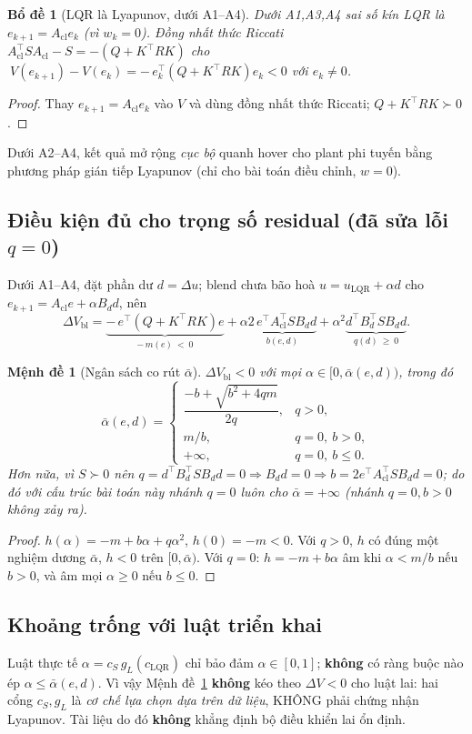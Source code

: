 \documentclass[11pt]{article}
\newtheorem{lemma}{Bổ đề}
\newtheorem{proposition}{Mệnh đề}
\newcommand{\T}{^{\!\top}}
\newcommand{\cS}{c_{S}}
\newcommand{\cL}{c_{\mathrm{LQR}}}
\newcommand{\uL}{u_{\mathrm{LQR}}}
\newcommand{\Acl}{A_{\mathrm{cl}}}
\begin{document}
\begin{lemma}[LQR là Lyapunov, dưới A1--A4]\label{lem1}
Dưới A1,A3,A4 sai số kín LQR là $e_{k+1}=\Acl e_k$ (vì $w_k=0$). Đồng nhất thức Riccati
$\Acl\T S\Acl-S=-(Q+K\T RK)$ cho $\ V(e_{k+1})-V(e_k)=-\,e_k\T(Q+K\T RK)e_k<0$ với $e_k\ne0$.
\end{lemma}
\begin{proof}
Thay $e_{k+1}=\Acl e_k$ vào $V$ và dùng đồng nhất thức Riccati; $Q+K\T RK\succ0$.
\end{proof}
\noindent Dưới A2--A4, kết quả mở rộng \emph{cục bộ} quanh hover cho plant phi tuyến bằng phương pháp gián
tiếp Lyapunov (chỉ cho bài toán điều chỉnh, $w=0$).

\subsection{Điều kiện đủ cho trọng số residual (đã sửa lỗi $q=0$)}
Dưới A1--A4, đặt phần dư $d=\Delta u$; blend chưa bão hoà $u=\uL+\alpha d$ cho $e_{k+1}=\Acl e+\alpha B_d d$,
nên
\begin{equation}
\Delta V_{\mathrm{bl}}
= \underbrace{-\,e\T(Q+K\T RK)e}_{-\,m(e)\ <\ 0}
+\alpha\underbrace{2\,e\T\Acl\T S B_d d}_{b(e,d)}
+\alpha^2\underbrace{d\T B_d\T S B_d d}_{q(d)\ \ge\ 0}. \label{eq:dv}
\end{equation}

\begin{proposition}[Ngân sách co rút $\bar\alpha$]\label{prop}
$\Delta V_{\mathrm{bl}}<0$ với mọi $\alpha\in[0,\bar\alpha(e,d))$, trong đó
\[
\bar\alpha(e,d)=
\begin{cases}
\dfrac{-b+\sqrt{b^2+4qm}}{2q}, & q>0,\\[2mm]
m/b, & q=0,\ b>0,\\[1mm]
+\infty, & q=0,\ b\le0.
\end{cases}
\]
Hơn nữa, vì $S\succ0$ nên $q=d\T B_d\T S B_d d=0\Rightarrow B_d d=0\Rightarrow b=2e\T\Acl\T S B_d d=0$; do
đó với cấu trúc bài toán này nhánh $q=0$ luôn cho $\bar\alpha=+\infty$ (nhánh $q=0,b>0$ không xảy ra).
\end{proposition}
\begin{proof}
$h(\alpha)=-m+b\alpha+q\alpha^2$, $h(0)=-m<0$. Với $q>0$, $h$ có đúng một nghiệm dương $\bar\alpha$, $h<0$
trên $[0,\bar\alpha)$. Với $q=0$: $h=-m+b\alpha$ âm khi $\alpha<m/b$ nếu $b>0$, và âm mọi $\alpha\ge0$ nếu
$b\le0$.
\end{proof}

\subsection{Khoảng trống với luật triển khai}
Luật thực tế $\alpha=\cS\,g_L(\cL)$ chỉ bảo đảm $\alpha\in[0,1]$; \textbf{không} có ràng buộc nào ép
$\alpha\le\bar\alpha(e,d)$. Vì vậy Mệnh đề~\ref{prop} \textbf{không} kéo theo $\Delta V<0$ cho luật lai:
hai cổng $\cS,g_L$ là \emph{cơ chế lựa chọn dựa trên dữ liệu}, KHÔNG phải chứng nhận Lyapunov. Tài liệu do
đó \textbf{không} khẳng định bộ điều khiển lai ổn định.
\end{document}
